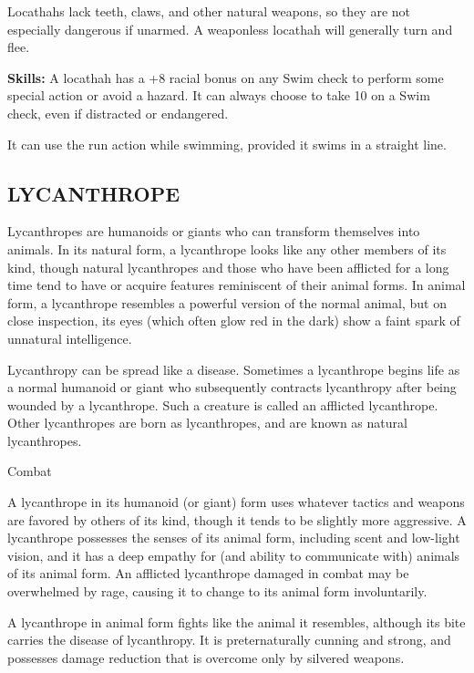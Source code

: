 \documentclass{article}
\begin{document}
Locathahs lack teeth, claws, and other natural weapons, so they are not especially 
dangerous if unarmed. A weaponless locathah will generally turn and flee.

\textbf{Skills:} A locathah has a +8 racial bonus on any Swim check to perform 
some special action or avoid a hazard. It can always choose to take 10 on a Swim 
check, even if distracted or endangered.

It can use the run action while swimming, provided it swims in a straight line.

\vspace{12pt}
\subsection*{{\LARGE{}LYCANTHROPE}}

Lycanthropes are humanoids or giants who can transform themselves into animals. 
In its natural form, a lycanthrope looks like any other members of its kind, though 
natural lycanthropes and those who have been afflicted for a long time tend to 
have or acquire features reminiscent of their animal forms. In animal form, a lycanthrope 
resembles a powerful version of the normal animal, but on close inspection, its 
eyes (which often glow red in the dark) show a faint spark of unnatural intelligence.

Lycanthropy can be spread like a disease. Sometimes a lycanthrope begins life as 
a normal humanoid or giant who subsequently contracts lycanthropy after being wounded 
by a lycanthrope. Such a creature is called an afflicted lycanthrope. Other lycanthropes 
are born as lycanthropes, and are known as natural lycanthropes.

Combat

A lycanthrope in its humanoid (or giant) form uses whatever tactics and weapons 
are favored by others of its kind, though it tends to be slightly more aggressive. 
A lycanthrope possesses the senses of its animal form, including scent and low-light 
vision, and it has a deep empathy for (and ability to communicate with) animals 
of its animal form. An afflicted lycanthrope damaged in combat may be overwhelmed 
by rage, causing it to change to its animal form involuntarily.

A lycanthrope in animal form fights like the animal it resembles, although its 
bite carries the disease of lycanthropy. It is preternaturally cunning and strong, 
and possesses damage reduction that is overcome only by silvered weapons.
\end{document}
